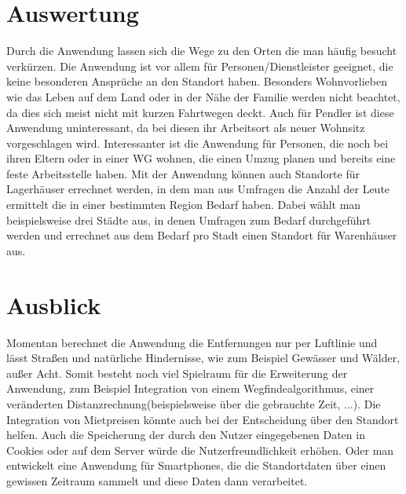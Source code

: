 \documentclass[a4paper, 12pt]{scrreprt}
\begin{document}
\section{Auswertung}
Durch die Anwendung lassen sich die Wege zu den Orten die man häufig besucht verkürzen.
Die Anwendung ist vor allem für Personen/Dienstleister geeignet, die keine besonderen Ansprüche an den Standort haben.
Besonders Wohnvorlieben wie das Leben auf dem Land oder in der Nähe der Familie werden nicht beachtet, da dies sich meist nicht mit kurzen Fahrtwegen deckt.
Auch für Pendler ist diese Anwendung uninteressant, da bei diesen ihr Arbeitsort als neuer Wohnsitz vorgeschlagen wird.
Interessanter ist die Anwendung für Personen, die noch bei ihren Eltern oder in einer WG wohnen, die einen Umzug planen und bereits eine feste Arbeitsstelle haben.
Mit der Anwendung können auch Standorte für Lagerhäuser errechnet werden, in dem man aus Umfragen die Anzahl der Leute ermittelt die in einer bestimmten Region Bedarf haben.
Dabei wählt man beispielsweise drei Städte aus, in denen Umfragen zum Bedarf durchgeführt werden und errechnet aus dem Bedarf pro Stadt einen Standort für Warenhäuser aus.
\section{Ausblick}
Momentan berechnet die Anwendung die Entfernungen nur per Luftlinie und lässt Straßen und natürliche Hindernisse, wie zum Beispiel Gewässer und Wälder, außer Acht.
Somit besteht noch viel Spielraum für die Erweiterung der Anwendung, zum Beispiel Integration von einem Wegfindealgorithmus, einer veränderten Distanzrechnung(beispielsweise über die gebrauchte Zeit, ...).
Die Integration von Mietpreisen könnte auch bei der Entscheidung über den Standort helfen.
Auch die Speicherung der durch den Nutzer eingegebenen Daten in Cookies oder auf dem Server würde die Nutzerfreundlichkeit erhöhen. Oder man entwickelt eine Anwendung für Smartphones, die die Standortdaten über einen gewissen Zeitraum sammelt und diese Daten dann verarbeitet.
\end{document}
